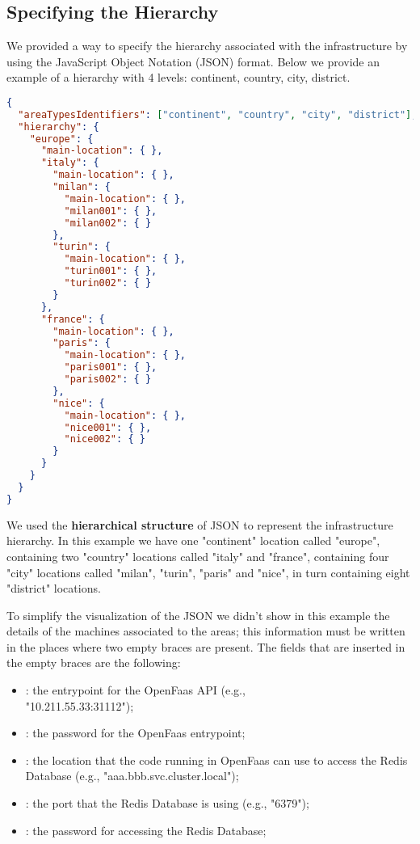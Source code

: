 \subsection{Specifying the Hierarchy}
We provided a way to specify the hierarchy associated with the infrastructure by using the JavaScript Object Notation (JSON) format.
Below we provide an example of a hierarchy with 4 levels: continent, country, city, district.

\begin{lstlisting}[language=json,firstnumber=1]
{
  "areaTypesIdentifiers": ["continent", "country", "city", "district"],
  "hierarchy": {
    "europe": {
      "main-location": { },
      "italy": {
        "main-location": { },
        "milan": {
          "main-location": { },
          "milan001": { },
          "milan002": { }
        },
        "turin": {
          "main-location": { },
          "turin001": { },
          "turin002": { }
        }
      },
      "france": {
        "main-location": { },
        "paris": {
          "main-location": { },
          "paris001": { },
          "paris002": { }
        },
        "nice": {
          "main-location": { },
          "nice001": { },
          "nice002": { }
        }
      }
    }
  }
}
\end{lstlisting}

We used the \textbf{hierarchical structure} of JSON to represent the infrastructure hierarchy. In this example we have one "continent" location called "europe", containing two "country" locations called "italy" and "france", containing four "city" locations called "milan", "turin", "paris" and "nice", in turn containing eight "district" locations.

To simplify the visualization of the JSON we didn't show in this example the details of the machines associated to the areas; this information must be written in the places where two empty braces \inlinecode{\{ \}} are present. The fields that are inserted in the empty braces are the following:

\begin{itemize}
    \item {}: the entrypoint for the OpenFaas API (e.g.,\\%
    "10.211.55.33:31112");
    \item {}: the password for the OpenFaas entrypoint;
    \item {}: the location that the code running in OpenFaas can use to access the Redis Database (e.g., "aaa.bbb.svc.cluster.local");
    \item {}: the port that the Redis Database is using (e.g., "6379");
    \item {}: the password for accessing the Redis Database;
\end{itemize}


